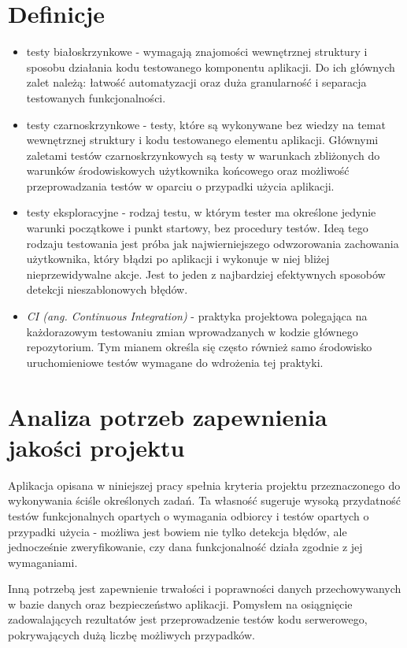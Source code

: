 \documentclass[declaration,shortabstract]{iithesis}
\begin{document}
\section{Definicje}
\begin{itemize}
	\item testy białoskrzynkowe - wymagają znajomości wewnętrznej struktury i sposobu działania kodu testowanego komponentu aplikacji. Do ich głównych zalet należą: łatwość automatyzacji oraz duża granularność i separacja testowanych funkcjonalności.
	\item testy czarnoskrzynkowe - testy, które są wykonywane bez wiedzy na temat wewnętrznej struktury i kodu testowanego elementu aplikacji. Głównymi zaletami testów czarnoskrzynkowych są testy w warunkach zbliżonych do warunków środowiskowych użytkownika końcowego oraz możliwość przeprowadzania testów w oparciu o przypadki użycia aplikacji.
	\item testy eksploracyjne - rodzaj testu, w którym tester ma określone jedynie warunki początkowe i punkt startowy, bez procedury testów. Ideą tego rodzaju testowania jest próba jak najwierniejszego odwzorowania zachowania użytkownika, który błądzi po aplikacji i wykonuje w niej bliżej nieprzewidywalne akcje. Jest to jeden z najbardziej efektywnych sposobów detekcji nieszablonowych błędów.
	\item \emph{CI (ang. Continuous Integration)} - praktyka projektowa polegająca na każdorazowym testowaniu zmian wprowadzanych w kodzie głównego repozytorium. Tym mianem określa się często również samo środowisko uruchomieniowe testów wymagane do wdrożenia tej praktyki.
\end{itemize}

\section{Analiza potrzeb zapewnienia jakości projektu}
Aplikacja opisana w niniejszej pracy spełnia kryteria projektu przeznaczonego do wykonywania ściśle określonych zadań. Ta własność sugeruje wysoką przydatność testów funkcjonalnych opartych o wymagania odbiorcy i testów opartych o przypadki użycia - możliwa jest bowiem nie tylko detekcja błędów, ale jednocześnie zweryfikowanie, czy dana funkcjonalność działa zgodnie z jej wymaganiami.

Inną potrzebą jest zapewnienie trwałości i poprawności danych przechowywanych w bazie danych oraz bezpieczeństwo aplikacji.  
Pomysłem na osiągnięcie zadowalających rezultatów jest przeprowadzenie testów kodu serwerowego, pokrywających dużą liczbę możliwych przypadków.
\end{document}
